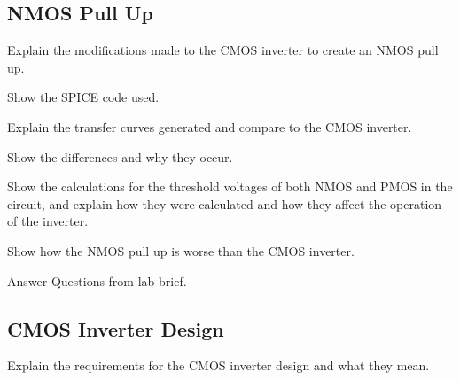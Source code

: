\documentclass[a4paper,12pt]{article}
\begin{document}
\subsection{NMOS Pull Up}

Explain the modifications made to the CMOS inverter to create an NMOS pull up.



Show the SPICE code used.

Explain the transfer curves generated and compare to the CMOS inverter.

Show the differences and why they occur.

Show the calculations for the threshold voltages of both NMOS and PMOS in the circuit, 
and explain how they were calculated and how they affect the operation of the inverter.

Show how the NMOS pull up is worse than the CMOS inverter.

Answer Questions from lab brief.

\subsection{CMOS Inverter Design}

Explain the requirements for the CMOS inverter design and what they mean. 
\end{document}
